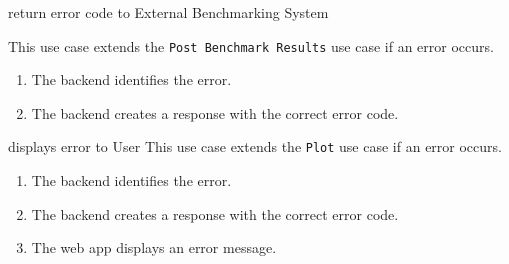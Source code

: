 \bigskip

{return error code to External Benchmarking System}
{}
{This use case extends the \texttt{Post Benchmark Results} use case if an error occurs.
\begin{enumerate}
    \item The backend identifies the error.
    \item The backend creates a response with the correct error code.
\end{enumerate}}
{}

\bigskip

{displays error to User}
{This use case extends the \texttt{Plot} use case if an error occurs.}
{\begin{enumerate}
    \item The backend identifies the error.
    \item The backend creates a response with the correct error code.
    \item The web app displays an error message.
\end{enumerate}}
{}

